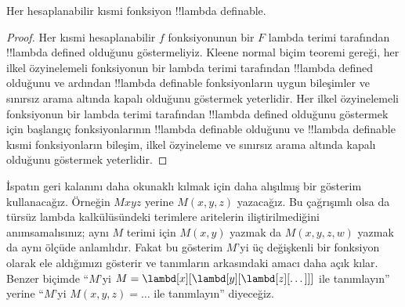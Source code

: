


\begin{thm}
Her hesaplanabilir kısmi fonksiyon !!{lambda definable}.
\end{thm}

\begin{proof}
Her kısmi hesaplanabilir $f$ fonksiyonunun bir $F$ lambda terimi tarafından
!!{lambda defined} olduğunu göstermeliyiz. Kleene normal biçim teoremi
gereği, her ilkel özyinelemeli fonksiyonun bir lambda terimi tarafından
!!{lambda defined} olduğunu ve ardından !!{lambda definable} fonksiyonların
uygun bileşimler ve sınırsız arama altında kapalı olduğunu göstermek
yeterlidir. Her ilkel özyinelemeli fonksiyonun bir lambda terimi tarafından
!!{lambda defined} olduğunu göstermek için başlangıç fonksiyonlarının
!!{lambda definable} olduğunu ve !!{lambda definable} kısmi fonksiyonların
bileşim, ilkel özyineleme ve sınırsız arama altında kapalı olduğunu
göstermek yeterlidir.
\end{proof}

İspatın geri kalanını daha okunaklı kılmak için daha alışılmış bir gösterim
kullanacağız. Örneğin $Mxyz$ yerine $M(x,y,z)$ yazacağız. Bu çağrışımlı olsa
da türsüz lambda kalkülüsündeki terimlere aritelerin iliştirilmediğini
anımsamalısınız; aynı $M$ terimi için $M(x,y)$ yazmak da $M(x,y,z,w)$ yazmak
da aynı ölçüde anlamlıdır. Fakat bu gösterim $M$'yi üç değişkenli bir
fonksiyon olarak ele aldığımızı gösterir ve tanımların arkasındaki amacı
daha açık kılar. Benzer biçimde ``$M$'yi
$M=\lambd[x][\lambd[y][\lambd[z][\dots]]]$ ile tanımlayın'' yerine
``$M$'yi $M(x,y,z)=\dots$ ile tanımlayın'' diyeceğiz.

